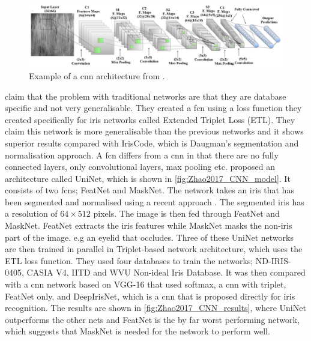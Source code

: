 \begin{figure}[H]
\centering
\includegraphics[width=\textwidth]{figures/Al_Waisy2017_CNN_model} 
\caption{Example of a \gls{cnn} architecture  from \cite{Al-Waisy2017}.}
\label{fig:Al_Waisy2017_CNN_model}
\end{figure}


\cite{Zhao2017a} claim that the problem with traditional networks are that they are database specific and not very generalisable. They created a \gls{fcn} using a loss function they created specifically for iris networks called Extended Triplet Loss (ETL). They claim this network is more generalisable than the previous networks and it shows superior results compared with IrisCode, which is Daugman's segmentation and normalisation approach. A \gls{fcn} differs from a \gls{cnn} in that there are no fully connected layers, only convolutional layers, max pooling etc. \cite{Zhao2017a} proposed an architecture called UniNet, which is shown in \autoref{fig:Zhao2017_CNN_model}. It consists of two \gls{fcn}s; FeatNet and MaskNet. The network takes an iris that has been segmented and normalised using a recent approach \citep{Zhao2015a}. The segmented iris has a resolution of $64\times512$ pixels. The image is then fed through FeatNet and MaskNet. FeatNet extracts the iris features while MaskNet masks the non-iris part of the image. e.g an eyelid that occludes. Three of these UniNet networks are then trained in parallel in Triplet-based network architecture, which uses the ETL loss function. They used four databases to train the networks; ND-IRIS-0405, CASIA V4, IITD and WVU Non-ideal Iris Database. It was then compared with a \gls{cnn} network based on VGG-16 that used softmax, a \gls{cnn} with triplet, FeatNet only, and DeepIrisNet, which is a \gls{cnn} that is proposed directly for iris recognition. The results are shown in \autoref{fig:Zhao2017_CNN_results}, where UniNet outperforms the other nets and FeatNet is the by far worst performing network, which suggests that MaskNet is needed for the network to perform well. 

